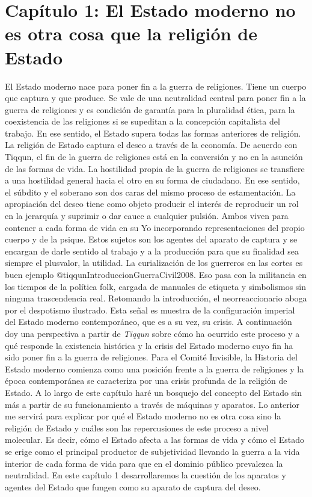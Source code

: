 \documentclass[
]{article}
\begin{document}
\hypertarget{capuxedtulo-1-el-estado-moderno-no-es-otra-cosa-que-la-religiuxf3n-de-estado}{%
\section{Capítulo 1: El Estado moderno no es otra cosa que la religión
de
Estado}\label{capuxedtulo-1-el-estado-moderno-no-es-otra-cosa-que-la-religiuxf3n-de-estado}}

El Estado moderno nace para poner fin a la guerra de religiones. Tiene
un cuerpo que captura y que produce. Se vale de una neutralidad central
para poner fin a la guerra de religiones y es condición de garantía para
la pluralidad ética, para la coexistencia de las religiones si se
supeditan a la concepción capitalista del trabajo. En ese sentido, el
Estado supera todas las formas anteriores de religión. La religión de
Estado captura el deseo a través de la economía. De acuerdo con Tiqqun,
el fin de la guerra de religiones está en la conversión y no en la
asunción de las formas de vida. La hostilidad propia de la guerra de
religiones se transfiere a una hostilidad general hacia el otro en su
forma de ciudadano. En ese sentido, el súbdito y el soberano son dos
caras del mismo proceso de estamentación. La apropiación del deseo tiene
como objeto producir el interés de reproducir un rol en la jerarquía y
suprimir o dar cauce a cualquier pulsión. Ambos viven para contener a
cada forma de vida en su Yo incorporando representaciones del propio
cuerpo y de la psique. Estos sujetos son los agentes del aparato de
captura y se encargan de darle sentido al trabajo y a la producción para
que su finalidad sea siempre el plusvalor, la utilidad. La curialización
de los guerreros en las cortes es buen ejemplo
@tiqqunIntroduccionGuerraCivil2008. Eso pasa con la militancia en los
tiempos de la política folk, cargada de manuales de etiqueta y
simbolismos sin ninguna trascendencia real. Retomando la introducción,
el neorreaccionario aboga por el despotismo ilustrado. Esta señal es
muestra de la configuración imperial del Estado moderno contemporáneo,
que es a su vez, su crisis. A continuación doy una perspectiva a partir
de \emph{Tiqqun} sobre cómo ha ocurrido este proceso y a qué responde la
existencia histórica y la crisis del Estado moderno cuyo fin ha sido
poner fin a la guerra de religiones. Para el Comité Invisible, la
Historia del Estado moderno comienza como una posición frente a la
guerra de religiones y la época contemporánea se caracteriza por una
crisis profunda de la religión de Estado. A lo largo de este capítulo
haré un bosquejo del concepto del Estado sin más a partir de su
funcionamiento a través de máquinas y aparatos. Lo anterior me servirá
para explicar por qué el Estado moderno no es otra cosa sino la religión
de Estado y cuáles son las repercusiones de este proceso a nivel
molecular. Es decir, cómo el Estado afecta a las formas de vida y cómo
el Estado se erige como el principal productor de subjetividad llevando
la guerra a la vida interior de cada forma de vida para que en el
dominio público prevalezca la neutralidad. En este capítulo 1
desarrollaremos la cuestión de los aparatos y agentes del Estado que
fungen como su aparato de captura del deseo.
\end{document}
